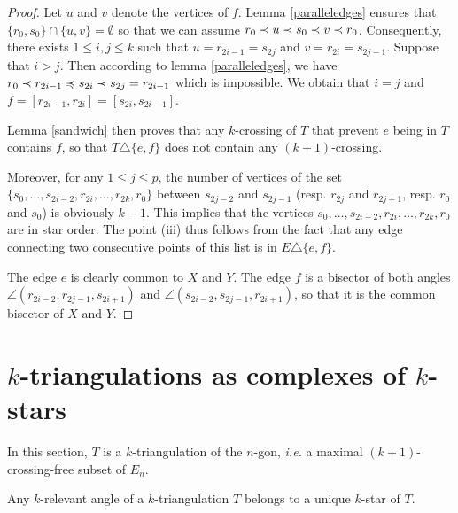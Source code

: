 \documentclass[12pt]{amsart}
\begin{document}
\begin{proof}
Let $u$ and $v$ denote the vertices of $f$.
Lemma \ref{paralleledges} ensures that $\{r_0,s_0\}\cap\{u,v\}=\emptyset$ so that we can assume $r_0\prec u\prec s_0\prec v\prec r_0$. Consequently, there exists $1\le i,j\le k$ such that $u=r_{2i-1}=s_{2j}$ and $v=r_{2i}=s_{2j-1}$. Suppose that $i>j$. Then according to  lemma \ref{paralleledges}, we have $r_0\prec r_{2i-1}\preccurlyeq s_{2i}\prec s_{2j}=r_{2i-1}$ which is impossible. We obtain that $i=j$ and $f=[r_{2i-1},r_{2i}]=[s_{2i},s_{2i-1}]$.

Lemma \ref{sandwich} then proves that any $k$-crossing of $T$ that prevent $e$ being in $T$ contains $f$, so that $T\triangle\{e,f\}$ does not contain any $(k+1)$-crossing.

Moreover, for any $1\le j\le p$, the number of vertices of the set $\{s_0,\ldots,s_{2i-2},r_{2i},\ldots,r_{2k},r_0\}$ between $s_{2j-2}$ and $s_{2j-1}$ (resp. $r_{2j}$ and $r_{2j+1}$, resp. $r_0$ and $s_0$) is obviously $k-1$. This implies that the vertices $s_0,\ldots,s_{2i-2},r_{2i},\ldots,r_{2k},r_0$ are in star order. The point (iii) thus follows from the fact that any edge connecting two consecutive points of this list is in $E\triangle\{e,f\}$.

The edge $e$ is clearly common to $X$ and $Y$. The edge $f$ is a bisector of both angles $\angle(r_{2i-2},r_{2j-1},s_{2i+1})$ and $\angle(s_{2i-2},s_{2j-1},r_{2i+1})$, so that it is the common bisector of $X$ and $Y$.
\end{proof}




\section{$k$-triangulations as complexes of $k$-stars}\label{sectioncomplexes}

In this section, $T$ is a $k$-triangulation of the $n$-gon, {\it i.e.} a maximal $(k+1)$-crossing-free subset of $E_n$.

\begin{theorem}\label{angle}
Any $k$-relevant angle of a $k$-triangulation $T$ belongs to a unique $k$-star of $T$.
\end{theorem}
\end{document}
